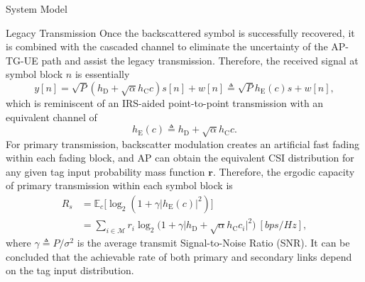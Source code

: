 \documentclass[journal]{IEEEtran}
\begin{document}
\begin{section}{System Model}
		\begin{subsection}{Legacy Transmission}
			Once the backscattered symbol is successfully recovered, it is combined with the cascaded channel to eliminate the uncertainty of the AP-TG-UE path and assist the legacy transmission. Therefore, the received signal at symbol block $n$ is essentially
			\begin{equation}
				y[n] = \sqrt{P} (h_{\mathrm{D}} + \sqrt{\alpha} h_{\mathrm{C}} c) s[n] + w[n] \triangleq \sqrt{P} h_{\mathrm{E}}(c) s + w[n],
			\end{equation}
			which is reminiscent of an IRS-aided point-to-point transmission with an equivalent channel of
			\begin{equation}
				h_{\mathrm{E}}(c) \triangleq h_{\mathrm{D}} + \sqrt{\alpha} h_{\mathrm{C}} c.
			\end{equation}
			For primary transmission, backscatter modulation creates an artificial fast fading within each fading block, and AP can obtain the equivalent CSI distribution for any given tag input probability mass function $\boldsymbol{r}$. Therefore, the ergodic capacity of primary transmission within each symbol block is \cite{Tse2005}
			\begin{align}
				R_s
				& = \mathbb{E}_c \bigl[ \log_2 (1 + \gamma \lvert h_{\mathrm{E}}(c) \rvert^2) \bigr] \nonumber \\
				& = \sum_{i \in \mathcal{M}} r_i \log_2 \bigl( 1 + \gamma \lvert h_{\mathrm{D}} + \sqrt{\alpha} h_{\mathrm{C}} c_i \rvert^2 \bigr) \ [\si{bps/Hz}],
				\label{eq:primary_rate}
			\end{align}
			where $\gamma \triangleq P / \sigma^2$ is the average transmit Signal-to-Noise Ratio (SNR). It can be concluded that the achievable rate of both primary and secondary links depend on the tag input distribution.
		\end{subsection}
		\label{se:system_model}
	\end{section}
\end{document}
